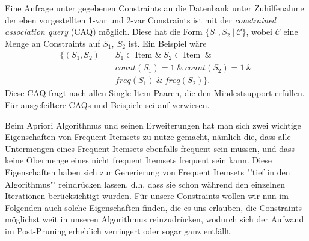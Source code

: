 Eine Anfrage unter gegebenen Constraints an die Datenbank
unter Zuhilfenahme der eben vorgestellten 1-var und 2-var 
Constraints ist mit der \textit{constrained association
query} (CAQ) möglich. Diese hat die Form \(\{S_1,S_2
\ |\ \mathcal{C}\}\), wobei \(\mathcal{C}\) eine
Menge an Constraints auf \(S_1,\ S_2\) ist. Ein Beispiel
wäre 
\begin{align*}
\{(S_1,S_2) \mid\
&S_1\subset \text{Item }\&\ S_2\subset \text{Item }\ \&\\
&count(S_1) = 1\ \&\ count(S_2) = 1\ \&\\
&freq(S_1)\ \&\ freq(S_2)\}.
\end{align*}
Diese CAQ fragt nach allen Single Item Paaren, die den 
Mindestsupport erfüllen. Für ausgefeiltere CAQs und Beispiele
sei auf \citet{Ng98} verwiesen.

Beim Apriori Algorithmus und seinen Erweiterungen hat
man sich zwei wichtige Eigenschaften von Frequent Itemsets
zu nutze gemacht, nämlich die, dass alle Untermengen eines
Frequent Itemsets ebenfalls frequent sein müssen, und
dass keine Obermenge eines nicht frequent Itemsets frequent
sein kann. Diese Eigenschaften haben sich zur Generierung
von Frequent Itemsets "'tief in den Algorithmus"' reindrücken
lassen, d.h. dass sie schon während den einzelnen Iterationen 
berücksichtigt wurden. Für unsere Constraints wollen wir
nun im Folgenden auch solche Eigenschaften finden, die es
uns erlauben, die Constraints möglichst weit in unseren
Algorithmus reinzudrücken, wodurch sich der Aufwand im
Post-Pruning erheblich verringert oder sogar ganz entfällt.

